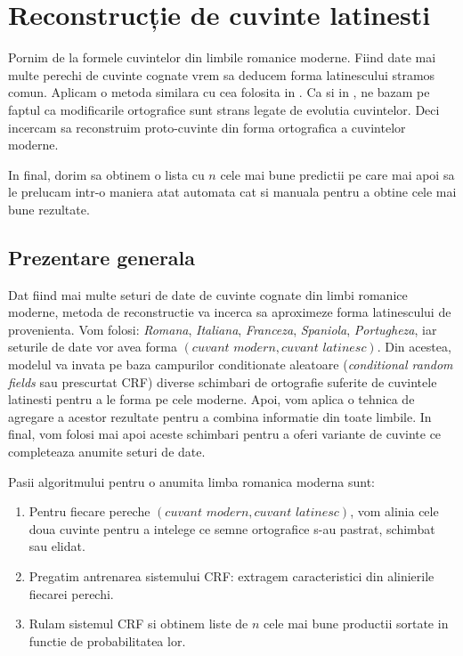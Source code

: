 \chapter{Reconstrucție de cuvinte latinesti}
\label{chap:two}
Pornim de la formele cuvintelor din limbile romanice moderne. Fiind date mai multe perechi de cuvinte
cognate vrem sa deducem forma latinescului stramos comun. Aplicam o metoda similara cu cea folosita
in \cite{theone}. Ca si in \cite{theone}, ne bazam pe faptul ca modificarile ortografice sunt strans
legate de evolutia cuvintelor. Deci incercam sa reconstruim proto-cuvinte din forma ortografica a
cuvintelor moderne.

In final, dorim sa obtinem o lista cu $n$ cele mai bune predictii pe care mai apoi sa le prelucam
intr-o maniera atat automata cat si manuala pentru a obtine cele mai bune rezultate.

\section{Prezentare generala}
Dat fiind mai multe seturi de date de cuvinte cognate din limbi romanice moderne, metoda de 
reconstructie va incerca sa aproximeze forma latinescului de provenienta. Vom folosi: \textit{Romana},
\textit{Italiana}, \textit{Franceza}, \textit{Spaniola}, \textit{Portugheza}, iar seturile de date
vor avea forma $(\textit{cuvant modern}, \textit{cuvant latinesc})$. Din acestea, modelul va invata 
pe baza campurilor conditionate aleatoare (\textit{conditional random fields} sau prescurtat CRF) 
diverse schimbari de ortografie suferite de cuvintele latinesti pentru a le forma pe cele moderne. 
Apoi, vom aplica o tehnica de agregare a acestor rezultate pentru a combina informatie din toate 
limbile. In final, vom folosi mai apoi aceste schimbari pentru a oferi variante de cuvinte ce 
completeaza anumite seturi de date.

Pasii algoritmului pentru o anumita limba romanica moderna sunt:

\begin{enumerate}
  \item Pentru fiecare pereche $(\textit{cuvant modern}, \textit{cuvant latinesc})$, vom alinia
    cele doua cuvinte pentru a intelege ce semne ortografice s-au pastrat, schimbat sau elidat.
  \item Pregatim antrenarea sistemului CRF: extragem caracteristici din alinierile fiecarei perechi.
  \item Rulam sistemul CRF si obtinem liste de $n$ cele mai bune productii sortate in functie de
    probabilitatea lor.
\end{enumerate}

